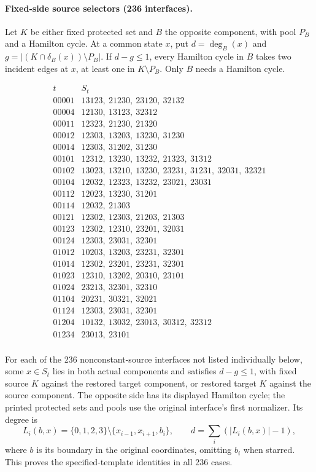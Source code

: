 \documentclass[11pt]{article}
\numberwithin{equation}{section}
\numberwithin{table}{section}
\begin{document}
\paragraph{Fixed-side source selectors (236 interfaces).}
Let $K$ be either fixed protected set and $B$ the opposite component,
with pool $P_B$ and a Hamilton cycle. At a common state $x$, put
$d=\deg_B(x)$ and $g=|(K\cap\delta_B(x))\setminus P_B|$.
If $d-g\le1$, every Hamilton cycle in $B$ takes two incident edges
at $x$, at least one in $K\setminus P_B$. Only $B$ needs a Hamilton cycle.

\[\begin{array}{c|l}t&S_t\\\hline
00001&13123,\ 21230,\ 23120,\ 32132\\
00004&12130,\ 13123,\ 32312\\
00011&12323,\ 21230,\ 21320\\
00012&12303,\ 13203,\ 13230,\ 31230\\
00014&12303,\ 31202,\ 31230\\
00101&12312,\ 13230,\ 13232,\ 21323,\ 31312\\
00102&13023,\ 13210,\ 13230,\ 23231,\ 31231,\ 32031,\ 32321\\
00104&12032,\ 12323,\ 13232,\ 23021,\ 23031\\
00112&12023,\ 13230,\ 31201\\
00114&12032,\ 21303\\
00121&12302,\ 12303,\ 21203,\ 21303\\
00123&12302,\ 12310,\ 23201,\ 32031\\
00124&12303,\ 23031,\ 32301\\
01012&10203,\ 13203,\ 23231,\ 32301\\
01014&12302,\ 23201,\ 23231,\ 32301\\
01023&12310,\ 13202,\ 20310,\ 23101\\
01024&23213,\ 32301,\ 32310\\
01104&20231,\ 30321,\ 32021\\
01124&12303,\ 23031,\ 32301\\
01204&10132,\ 13032,\ 23013,\ 30312,\ 32312\\
01234&23013,\ 23101\\
\end{array}\]


For each of the 236 nonconstant-source interfaces not listed individually
below, some $x\in S_t$ lies in both actual components and satisfies
$d-g\le1$, with fixed source $K$ against the restored target component,
or restored target $K$ against the source component. The opposite side
has its displayed Hamilton cycle; the printed protected sets and pools
use the original interface's first normalizer. Its degree is
\[
L_i(b,x)=\{0,1,2,3\}\setminus\{x_{i-1},x_{i+1},b_i\},\qquad
d=\sum_i(|L_i(b,x)|-1),
\]
where $b$ is its boundary in the original coordinates, omitting $b_i$
when starred. This proves the specified-template identities in all 236 cases.
\end{document}
